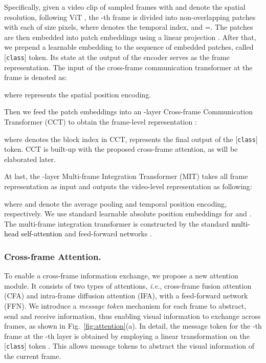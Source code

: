 \documentclass[runningheads]{llncs}
\begin{document}
Specifically, given a video clip 
of  sampled frames with  and  denote the spatial resolution, following ViT \cite{dosovitskiy2020image}, the -th frame is divided into  non-overlapping patches  
with each of size  pixels, where  denotes the temporal index, and =. The patches  are then embedded into patch embeddings using a linear projection . After that, we prepend a learnable embedding  to the sequence of embedded patches, called [\texttt{class}] token. Its state at the output of the encoder serves as the frame representation. The input of the cross-frame communication transformer at the frame  is denoted as:


where  represents the spatial position encoding.

Then we feed the patch embeddings into an -layer Cross-frame Communication Transformer (CCT) to obtain the frame-level representation :


where  denotes the block index in CCT,  represents the final output of the [\texttt{class}] token. CCT is built-up with the proposed cross-frame attention, as will be elaborated later.

At last, the -layer Multi-frame Integration Transformer (MIT) takes all frame representation  as input and outputs the video-level representation  as following:

where  and  denote the average pooling and temporal position encoding, respectively. We use standard learnable absolute position embeddings \cite{vaswani2017attention} for  and . The multi-frame integration transformer is constructed by the standard \textcolor{black}{multi-head self-attention} and feed-forward networks \cite{vaswani2017attention}.

\vspace{-0.4cm}
\subsubsection{Cross-frame Attention.} 
To enable a cross-frame information exchange, we propose a new attention module. It consists of two types of attentions, \emph{i.e.}, cross-frame fusion attention (CFA) and intra-frame diffusion attention (IFA), with a feed-forward network (FFN). We introduce a \textit{message token} mechanism for each frame to abstract, send and receive information, thus enabling visual information to exchange across frames, as shown in Fig.~\ref{fig:attention}(a). In detail, the message token  for the -th frame at the -th layer is obtained by employing 
a linear transformation on the 
[\texttt{class}] token .
This allows message tokens to abstract the visual information of the current frame.
\end{document}
